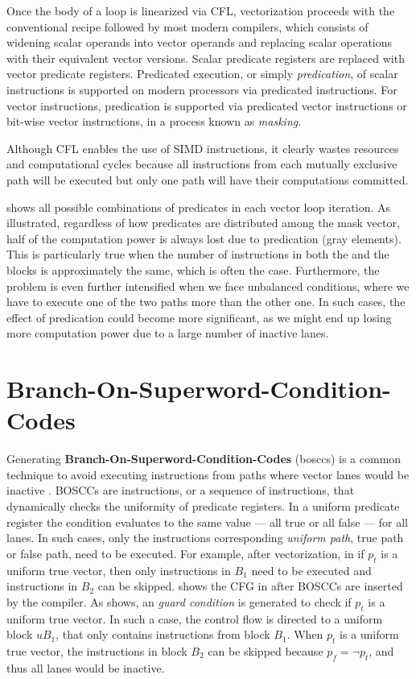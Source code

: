 Once the body of a loop is linearized via CFL, vectorization proceeds with the conventional recipe followed by most modern compilers, which consists of widening scalar operands into vector operands and replacing scalar operations with their equivalent vector versions.
Scalar predicate registers are replaced with vector predicate registers.
Predicated execution, or simply \emph{predication}, of scalar instructions is supported on modern processors via predicated instructions.
For vector instructions, predication is supported via predicated vector instructions or bit-wise vector instructions, in a process known as \emph{masking}.

Although CFL enables the use of SIMD instructions, it clearly wastes resources and computational cycles because all instructions from each mutually exclusive path will be executed but only one path will have their computations committed.

 shows all possible combinations of predicates in each vector loop iteration. As illustrated, regardless of how predicates are distributed among the mask vector, half of the computation power is always lost due to predication (gray elements). This is particularly true when the number of instructions in both the  and the  blocks is approximately the same, which is often the case. Furthermore, the problem is even further intensified when we face unbalanced conditions, where we have to execute one of the two paths more than the other one. In such cases, the effect of predication  could become more significant, as we might end up losing more computation power due to a large number of inactive lanes.


\section{Branch-On-Superword-Condition-Codes}

Generating \textbf{Branch-On-Superword-Condition-Codes} (\acrshort{boscc}s) is a common technique to avoid executing instructions from paths where vector lanes would be inactive \cite{ jaewook_shin_superword-level_2005, shin_introducing_2007, shin_evaluating_2009}.
BOSCCs are instructions, or a sequence of instructions, that dynamically checks the uniformity of predicate registers.
In a uniform predicate register the condition evaluates to the same value --- all true or all false --- for all lanes.
In such cases, only the instructions corresponding \emph{uniform path}, true path or false path, need to be executed.
For example, after vectorization, in  if $p_t$ is a uniform true vector, then only instructions in $B_1$ need to be executed and instructions in $B_2$ can be skipped.
 shows the CFG in  after BOSCCs are inserted by the compiler.
As  shows, an  \emph{guard condition} is generated to check if $p_t$ is a uniform true vector.
In such a case, the control flow is directed to a uniform block $uB_1$, that only contains instructions from block $B_1$.
When $p_t$ is a uniform true vector, the instructions in block $B_2$ can be skipped because $p_f = \neg p_t$, and thus all lanes would be inactive.



